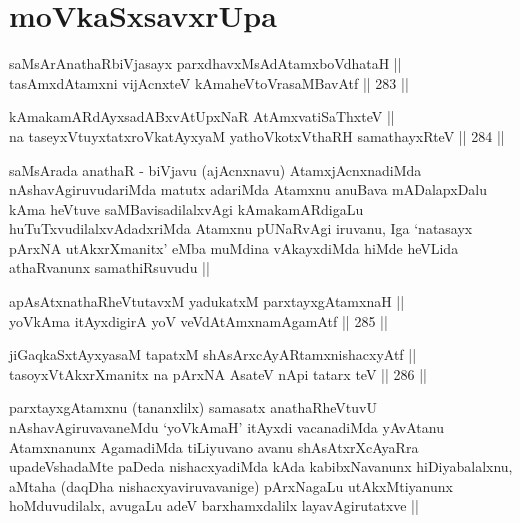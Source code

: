 
\section*{moVkaSxsavxrUpa}

\begin{shl}
saMsArAnathaRbiVjasayx parxdhavxMsAdAtamxboVdhataH || \\
tasAmxdAtamxni vijAcnxteV kAmaheVtoVrasaMBavAtf ||  283 ||  
\end{shl}
				
\begin{shl}
kAmakamARdAyxsadABxvAtUpxNaR AtAmx\s vatiSaThxteV ||  \\
na taseyxVtuyxtatxroVkatAyx\s yaM yathoVkotxV\s thaRH samathayxRteV ||  284 ||  
\end{shl}

\begin{artha}
saMsArada anathaR - biVjavu (ajAcnxnavu) AtamxjAcnxnadiMda
nAshavAgiruvudariMda matutx adariMda Atamxnu anuBava mADalapxDalu kAma
heVtuve saMBavisadilalxvAgi kAmakamARdigaLu huTuTxvudilalxvAdadxriMda
Atamxnu pUNaRvAgi iruvanu, Iga `natasayx pArxNA utAkxrXmanitx' eMba
muMdina vAkayxdiMda hiMde heVLida athaRvanunx samathiRsuvudu ||
\end{artha}

\begin{shl}
apAsAtxnathaRheVtutavxM yadukatxM parxtayxgAtamxnaH || \\
yoV\s kAma itAyxdigirA yoV veVdA\s \s tAmxnamAgamAtf ||  285 ||  
\end{shl}
				
\begin{shl}
jiGaqkaSxtAyxyasaM tapatxM shAsArxcAyARtamxnishacxyAtf ||  \\
tasoyxVtAkxrXmanitx na pArxNA AsateV nApi tatarx teV ||  286 ||  
\end{shl}

\begin{artha}
parxtayxgAtamxnu (tananxlilx) samasatx anathaRheVtuvU
nAshavAgiruvavaneMdu `yoV\s kAmaH' itAyxdi vacanadiMda yAvAtanu
Atamxnanunx AgamadiMda tiLiyuvano avanu shAsAtxrXcAyaRra
upadeVshadaMte paDeda nishacxyadiMda kAda kabibxNavanunx
hiDiyabalalxnu, aMtaha (daqDha nishacxyaviruvavanige) pArxNagaLu
utAkxMtiyanunx hoMduvudilalx, avugaLu adeV barxhamxdalilx
layavAgirutatxve ||
\end{artha}


